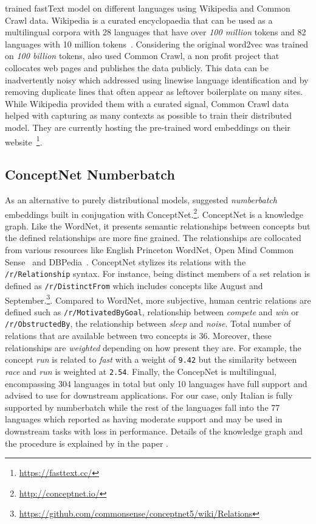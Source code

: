 \textcite{grave_learning_2018} trained fastText model on different languages using Wikipedia and Common Crawl data.
Wikipedia is a curated encyclopaedia that can be used as a multilingual corpora with 28 languages that have over \emph{100 million} tokens and 82 languages with 10 million tokens~\cite{grave_learning_2018}.
Considering the original word2vec was trained on \emph{100 billion} tokens, \citeauthor{grave_learning_2018} also used Common Crawl, a non profit project that collocates web pages and publishes the data publicly.
This data can be inadvertently noisy which \citeauthor{grave_learning_2018} addressed using linewise language identification and by removing duplicate lines that often appear as leftover boilerplate on many sites.
While Wikipedia provided them with a curated signal, Common Crawl data helped with capturing as many contexts as possible to train their distributed model.
They are currently hosting the pre-trained word embeddings on their website~\footnote{\url{https://fasttext.cc/}}.

\subsection{ConceptNet Numberbatch}%
\label{sub:conceptnet_numberbatch}

As an alternative to purely distributional models, \textcite{speer_conceptnet_2017} suggested \emph{numberbatch} embeddings built in conjugation with ConceptNet.\footnote{\url{http://conceptnet.io/}}.
ConceptNet is a knowledge graph.
Like the WordNet, it presents semantic relationships between concepts but the defined relationships are more fine grained.
The relationships are collocated from various resources like English Princeton WordNet, Open Mind Common Sense~\cite{anacleto_can_2006} and DBPedia~\cite{auer_dbpedia_2007}.
ConceptNet stylizes its relations with the \texttt{/r/Relationship} syntax.
For instance, being distinct members of a set relation is defined as \texttt{/r/DistinctFrom} which includes concepts like August and September.\footnote{\url{https://github.com/commonsense/conceptnet5/wiki/Relations}}.
Compared to WordNet, more subjective, human centric relations are defined such as \texttt{/r/MotivatedByGoal}, relationship between \emph{compete} and \emph{win} or \texttt{/r/ObstructedBy}, the relationship between \emph{sleep} and \emph{noise}.
Total number of relations that are available between two concepts is 36.
Moreover, these relationships are \emph{weighted} depending on how present they are.
For example, the concept \emph{run} is related to \emph{fast} with a weight of \texttt{9.42} but the similarity between \emph{race} and \emph{run} is weighted at \texttt{2.54}.
Finally, the ConcepNet is multilingual, encompassing 304 languages in total but only 10 languages have full support and advised to use for downstream applications.
For our case, only Italian is fully supported by numberbatch while the rest of the languages fall into the 77 languages which reported as having moderate support and may be used in downstream tasks with loss in performance.
Details of the knowledge graph and the procedure is explained by \textcite{speer_conceptnet_2017} in the paper .

